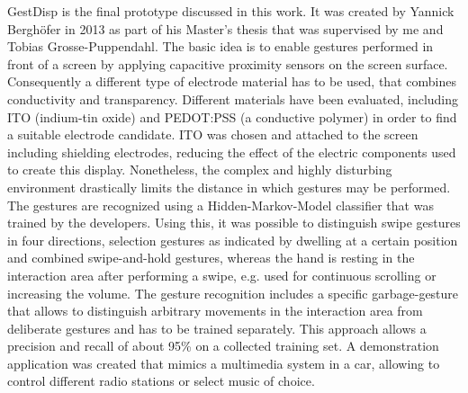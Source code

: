 GestDisp is the final prototype discussed in this work. It was created by Yannick Berghöfer in 2013 as part of his Master's thesis that was supervised by me and Tobias Grosse-Puppendahl. The basic idea is to enable gestures performed in front of a screen by applying capacitive proximity sensors on the screen surface. Consequently a different type of electrode material has to be used, that combines conductivity and transparency. Different materials have been evaluated, including ITO (indium-tin oxide) and PEDOT:PSS (a conductive polymer) in order to find a suitable electrode candidate. ITO was chosen and attached to the screen including shielding electrodes, reducing the effect of the electric components used to create this display. Nonetheless, the complex and highly disturbing environment drastically limits the distance in which gestures may be performed. The gestures are recognized using a Hidden-Markov-Model classifier that was trained by the developers.  Using this, it was possible to distinguish swipe gestures in four directions, selection gestures as indicated by dwelling at a certain position and combined swipe-and-hold gestures, whereas the hand is resting in the interaction area after performing a swipe, e.g. used for continuous scrolling or increasing the volume. The gesture recognition includes a specific garbage-gesture that allows to distinguish arbitrary movements in the interaction area from deliberate gestures and has to be trained separately. This approach allows a precision and recall of about 95\% on a collected training set. A demonstration application was created that mimics a multimedia system in a car, allowing to control different radio stations or select music of choice.  
